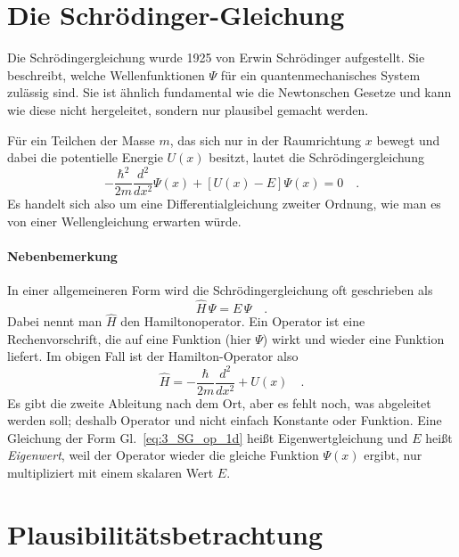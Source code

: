 \section{Die Schrödinger-Gleichung}

Die Schrödingergleichung wurde 1925 von Erwin Schrödinger aufgestellt. Sie beschreibt, welche Wellenfunktionen $\Psi$ für ein quantenmechanisches System zulässig sind. Sie ist ähnlich fundamental wie die Newtonschen Gesetze und kann wie diese nicht hergeleitet, sondern nur plausibel gemacht werden.

Für ein Teilchen der Masse $m$, das sich nur in der Raumrichtung $x$ bewegt und dabei die potentielle Energie $U(x)$ besitzt, lautet die Schrödingergleichung
\begin{equation}
   - \frac{\hbar^2}{2m} \frac{d^2}{dx^2} \Psi(x) + \left[ U(x) - E \right] \Psi(x) = 0 \quad .
   \label{eq:3_SG_1d}
 \end{equation}
 Es handelt sich also um eine Differentialgleichung zweiter Ordnung, wie man es von einer Wellengleichung erwarten würde.


\paragraph*{Nebenbemerkung} In einer allgemeineren Form wird die Schrödingergleichung oft  geschrieben als
\begin{equation}
    \hat{H} \, \Psi = E \, \Psi \quad .
    \label{eq:3_SG_op_1d}
\end{equation}
Dabei nennt man $\hat{H}$ den Hamiltonoperator. Ein Operator ist eine Rechenvorschrift, die auf eine Funktion (hier $\Psi$) wirkt und wieder eine Funktion liefert. Im obigen Fall ist der Hamilton-Operator also
\begin{equation}
    \hat{H} = - \frac{\hbar}{2m} \frac{d^2}{dx^2} + U(x) \quad .
\end{equation}
Es gibt die zweite Ableitung nach dem Ort, aber es fehlt noch, was abgeleitet werden soll; deshalb Operator und nicht einfach Konstante oder Funktion. 
Eine Gleichung der Form Gl.~\ref{eq:3_SG_op_1d} heißt Eigenwertgleichung und $E$ heißt \emph{Eigenwert}, weil der Operator wieder die gleiche Funktion $\Psi(x)$ ergibt, nur multipliziert mit einem skalaren Wert $E$.

\section{Plausibilitätsbetrachtung}

